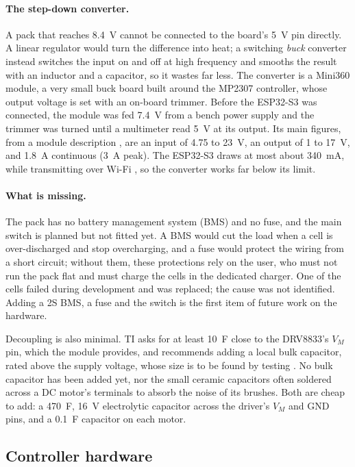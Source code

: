 \paragraph{The step-down converter.} A pack that reaches 8.4~V cannot be connected to the
board's 5~V pin directly. A linear regulator would turn the difference into heat; a
switching \emph{buck} converter instead switches the input on and off at high frequency
and smooths the result with an inductor and a capacitor, so it wastes far less. The
converter is a Mini360 module, a very small buck board built around the MP2307 controller, whose output
voltage is set with an on-board trimmer. Before the ESP32-S3 was connected, the module
was fed 7.4~V from a bench power supply and the trimmer was turned until a multimeter
read 5~V at its output. Its main figures, from a module description \cite{mini360_c101}, are an input
of 4.75 to 23~V, an output of 1 to 17~V, and 1.8~A continuous (3~A peak). The ESP32-S3
draws at most about 340~mA, while transmitting over Wi-Fi \cite{esp32s3_datasheet}, so
the converter works far below its limit.

\paragraph{What is missing.} The pack has no battery management system (BMS) and no
fuse, and the main switch is planned but not fitted yet. A BMS would cut the load when a
cell is over-discharged and stop overcharging, and a fuse would protect the wiring from
a short circuit; without them, these protections rely on the user, who must not run the
pack flat and must charge the cells in the dedicated charger. One of the cells failed
during development and was replaced; the cause was not identified. Adding a 2S BMS, a
fuse and the switch is the first item of future work on the hardware.

Decoupling is also minimal. TI asks for at least 10~\textmu F close to the DRV8833's
\(V_M\) pin, which the module provides, and recommends adding a local bulk capacitor,
rated above the supply voltage, whose size is to be found by testing
\cite{drv8833_datasheet}. No bulk capacitor has been added yet, nor the small ceramic
capacitors often soldered across a DC motor's terminals to absorb the noise of its
brushes. Both are cheap to add: a 470~\textmu F, 16~V electrolytic capacitor across the
driver's \(V_M\) and GND pins, and a 0.1~\textmu F capacitor on each motor.

\subsection{Controller hardware}
\label{sec:controller}

